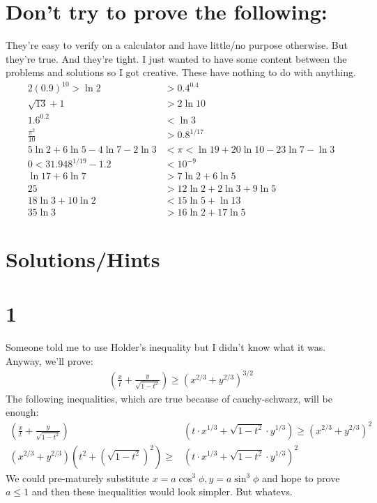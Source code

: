 \documentclass{article}
\begin{document}
\section*{Don't try to prove the following:}
They're easy to verify on a calculator and have little/no purpose otherwise. But they're true. And they're tight. I just wanted to have some content between the problems and solutions so I got creative. These have nothing to do with anything.
\begin{align}
    2(0.9)^{10} > \ln2 &> 0.4^{0.4} \\
    \sqrt{13}+1 &> 2\ln 10 \\
    1.6^{0.2} &< \ln3 \\
    \frac{\pi^2}{10} &> 0.8^{1/17} \\
    5 \ln 2 + 6 \ln 5 -4 \ln 7 - 2 \ln 3 &< \pi < \ln 19 + 20 \ln 10 -23 \ln 7 - \ln 3 \\
    0<31.948^{1/19} - 1.2 &< 10^{-9} \\
    \ln17 + 6\ln 7 &> 7\ln2 + 6\ln 5 \\
    25 &> 12\ln2 + 2\ln3 + 9\ln5 \\
    18\ln3 + 10\ln2 &< 15\ln5+\ln13 \\
    35\ln3 &> 16\ln2+17\ln5 
\end{align}

\section*{Solutions/Hints}
\section*{1}
Someone told me to use Holder's inequality but I didn't know what it was. Anyway, we'll prove:
\begin{align*}
    \left(\frac{x}{t} + \frac{y}{\sqrt{1-t^2}}\right) \geq \left(x^{2/3} + y^{2/3}\right)^{3/2}
\end{align*}
The following inequalities, which are true because of cauchy-schwarz, will be enough:
\begin{align*}
    \left(\frac{x}{t} + \frac{y}{\sqrt{1-t^2}}\right)&\left(t\cdot x^{1/3} + \sqrt{1-t^2} \cdot y^{1/3}\right) \geq \left(x^{2/3} + y^{2/3}\right)^{2} \\
    \left(x^{2/3} + y^{2/3}\right)\left(t^2 + (\sqrt{1-t^2})^2\right) \geq &\left(t\cdot x^{1/3} + \sqrt{1-t^2} \cdot y^{1/3}\right)^2
\end{align*}
We could pre-maturely substitute $x=a\cos^3\phi, y=a\sin^3\phi$ and hope to prove $a\leq 1$ and then these inequalities would look simpler. But whatevs.
\end{document}

